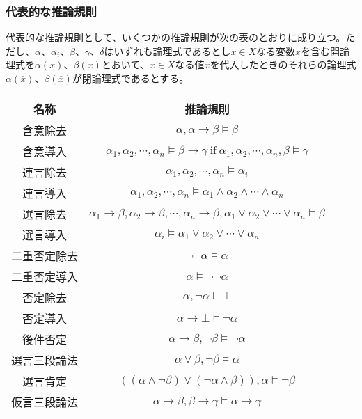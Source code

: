 \documentclass[a4paper]{jsarticle}
\begin{document}
\subsubsection{代表的な推論規則}%
\begin{thm}
\label{1.1.1.9}
代表的な推論規則として、いくつかの推論規則が次の表のとおりに成り立つ。ただし、$\alpha$、$\alpha_{i}$、$\beta$、$\gamma$、$\delta$はいずれも論理式であるとし$x \in X$なる変数$x$を含む開論理式を$\alpha(x)$、$\beta(x)$とおいて、$\overline{x} \in X$なる値$\overline{x}$を代入したときのそれらの論理式$\alpha\left( \overline{x} \right)$、$\beta\left( \overline{x} \right)$が閉論理式であるとする。
\begin{longtable}[c]{|c|c|}
\hline
名称 & 推論規則 \\
\hline \hline
含意除去 & $\alpha,\alpha \rightarrow \beta \vDash \beta$ \\
\hline
含意導入 & $\alpha_{1},\alpha_{2},\cdots,\alpha_{n} \vDash \beta \rightarrow \gamma\ \mathrm{if}\ \alpha_{1},\alpha_{2},\cdots,\alpha_{n},\beta \vDash \gamma$ \\
\hline
連言除去 & $\alpha_{1},\alpha_{2},\cdots,\alpha_{n} \vDash \alpha_{i}$ \\
\hline
連言導入 & $\alpha_{1},\alpha_{2},\cdots,\alpha_{n} \vDash \alpha_{1} \land \alpha_{2} \land \cdots \land \alpha_{n}$ \\
\hline
選言除去 & $\alpha_{1} \rightarrow \beta,\alpha_{2} \rightarrow \beta,\cdots,\alpha_{n} \rightarrow \beta,\alpha_{1} \vee \alpha_{2} \vee \cdots \vee \alpha_{n} \vDash \beta$ \\
\hline
選言導入 & $\alpha_{i} \vDash \alpha_{1} \vee \alpha_{2} \vee \cdots \vee \alpha_{n}$ \\
\hline
二重否定除去 & $\neg\neg\alpha \vDash \alpha$ \\
\hline
二重否定導入 & $\alpha \vDash \neg\neg\alpha$ \\
\hline
否定除去 & $\alpha,\neg\alpha \vDash \bot$ \\
\hline
否定導入 & $\alpha \rightarrow \bot \vDash \neg\alpha$ \\
\hline
後件否定 & $\alpha \rightarrow \beta,\neg\beta \vDash \neg\alpha$ \\
\hline
選言三段論法 & $\alpha \vee \beta,\neg\beta \vDash \alpha$ \\
\hline
選言肯定 & $\left( (\alpha \land \neg\beta) \vee (\neg\alpha \land \beta) \right),\alpha \vDash \neg\beta$ \\
\hline
仮言三段論法 & $\alpha \rightarrow \beta,\beta \rightarrow \gamma \vDash \alpha \rightarrow \gamma$ \\

\end{longtable}
\end{thm}
\end{document}
